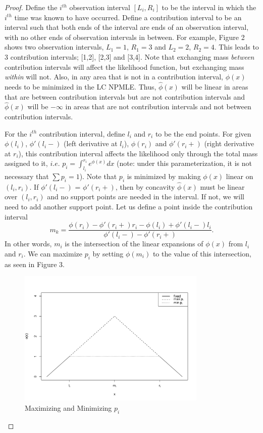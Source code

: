 	\begin{proof}

	Define the $i^{th}$ observation interval $[L_i, R_i]$ to be the interval in which the $i^{th}$ time was known to have occurred. Define a contribution interval to be an interval such that both ends of the interval are ends of an observation interval, with no other ends of observation intervals in between. For example, Figure 2 shows two observation intervals, $L_1 = 1$, $R_1 = 3$ and $L_2 = 2$, $R_2 = 4$. This leads to 3 contribution intervals; [1,2], [2,3] and [3,4]. Note that exchanging mass \emph{between} contribution intervals will affect the likelihood function, but exchanging mass \emph{within} will not. Also, in any area that is not in a contribution interval, $\phi(x)$ needs to be minimized in the LC NPMLE. Thus, $\hat \phi(x)$ will be linear in areas that are between contribution intervals but are not contribution intervals and $\hat \phi(x)$ will be $-\infty$ in areas that are not contribution intervals and not between contribution intervals. 

	For the $i^{th}$ contribution interval, define $l_i$ and $r_i$ to be the end points. For given $\phi(l_i)$, $\phi'(l_i -)$ (left derivative at $l_i$), $\phi(r_i)$ and $\phi'(r_i+)$ (right derivative at $r_i$), this contribution interval affects the likelihood only through the total mass assigned to it, $i.e.$ $p_i = \int_{l_i}^{r_i} e^ {\phi(x)} dx$ (note: under this parameterization, it is not necessary that $\sum p_i = 1$). Note that $p_i$ is minimized by making $\phi(x)$ linear on $(l_i, r_i)$. If $\phi'(l_i - )$ = $\phi'(r_i + )$, then by concavity $\hat{\phi}(x)$ must be linear over $(l_i, r_i)$ and no support points are needed in the interval. If not, we will need to add another support point. Let us define a point inside the contribution interval 	
	\[ m_k = \frac{\phi(r_i) - \phi'(r_i + ) r_i - \phi(l_i) + \phi'(l_i - ) l_i} { \phi'(l_i - ) - \phi'(r_i + )}.
	\]		
	In other words, $m_i$ is the intersection of the linear expansions of $\phi(x)$ from $l_i$ and $r_i$. We can maximize $p_i$ by setting $\phi(m_i)$ to the value of this intersection, as seen in Figure 3. 

	\begin{figure}[h]
\centerline{\includegraphics[width = 9cm]{maxminpk.pdf}}
\caption{Maximizing and Minimizing $p_i$}
\end{figure}		


\end{proof}
